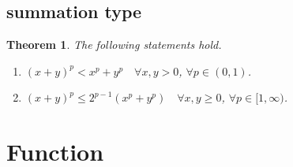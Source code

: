 \documentclass[11pt,a4paper]{report}
\newtheorem{theorem}{Theorem}[section]
\theoremstyle{definition}
\begin{document}
\subsection{summation type}

\begin{theorem}
	The following statements hold.
	\begin{enumerate}[label=(\alph*)] 
		\rm\item $(x+y)^{p} < x^{p}+y^{p} \quad \forall x, y > 0$, $\forall p \in (0, 1)$.
		\rm\item $(x + y)^{p} \leq 2^{p - 1}\left(x^{p} + y^{p}\right) \quad \forall x, y \geq 0$, $\forall p \in [1, \infty)$.
	\end{enumerate}
\end{theorem}
\section{Function}
\end{document}
